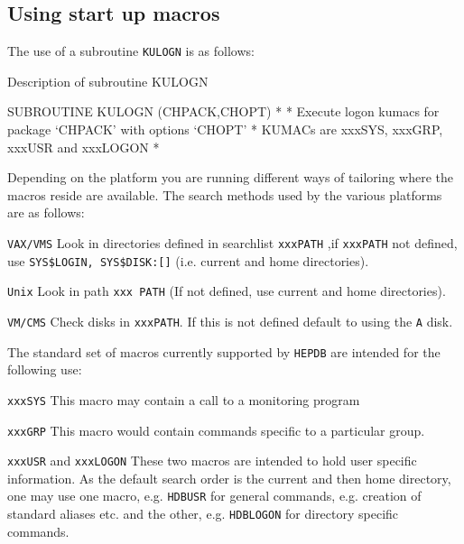 \subsection{Using start up macros}
The use of a subroutine {\tt KULOGN} is as follows:
\begin{XMPt}{Description of subroutine KULOGN}

      SUBROUTINE KULOGN (CHPACK,CHOPT)
*
*    Execute logon kumacs for package `CHPACK' with options `CHOPT'
*    KUMACs are xxxSYS, xxxGRP, xxxUSR and xxxLOGON
*

\end{XMPt}
Depending on the platform you are running different ways of tailoring
where the macros reside are available. The search methods used by the
various platforms are as follows:
\begin{UL}
\item {\tt VAX/VMS}
\subitem Look in directories defined in searchlist {\tt xxxPATH}
,if {\tt xxxPATH} not defined, use {\tt SYS\$LOGIN,
SYS\$DISK:[]}
(i.e. current and home directories).
\item {\tt Unix}
\subitem Look in path {\tt xxx PATH} (If not defined, use
current and home directories).
\item {\tt VM/CMS}
\subitem Check disks in {\tt xxxPATH}. If this is not defined
default to using the {\tt A} disk.
\end{UL}
\par
The standard set of macros currently supported by {\tt HEPDB}
are intended for the following use:
\begin{UL}
\item {\tt xxxSYS}
\subitem This macro may contain a call to a monitoring program
\item {\tt xxxGRP}
\subitem This macro would contain commands specific to a particular group.
\item {\tt xxxUSR} and {\tt xxxLOGON}
\subitem These two macros are intended to hold user specific information.
As the default search order is the current and then home directory,
one may use one macro, e.g. {\tt HDBUSR} for general commands, e.g.
creation of standard aliases etc. and the other, e.g. {\tt HDBLOGON}
for directory specific commands.
\end{UL}
%
%
%
